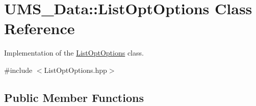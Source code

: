 \hypertarget{classUMS__Data_1_1ListOptOptions}{
\section{UMS\_\-Data::ListOptOptions Class Reference}
\label{classUMS__Data_1_1ListOptOptions}
}


Implementation of the \hyperlink{classUMS__Data_1_1ListOptOptions}{ListOptOptions} class.  




{\ttfamily \#include $<$ListOptOptions.hpp$>$}

\subsection*{Public Member Functions}
